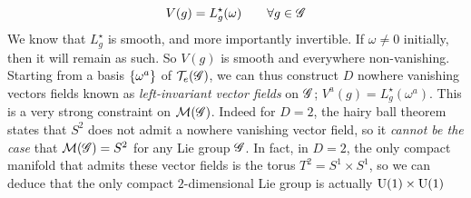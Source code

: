 \begin{equation}
V(g) = L_g^{\star}(\omega) \qquad \forall g \in \mathscr{G}
\end{equation}
We know that $L_g^{\star}$ is smooth, and more importantly invertible. If $\omega \neq 0$ initially, then it will remain as such. So $V(g)$ is smooth and everywhere non-vanishing. Starting from a basis $\set{\omega^a}$ of $\mathcal{T}_e(\mathscr{G})$, we can thus construct $D$ nowhere vanishing vectors fields known as \emph{left-invariant vector fields} on $\mathscr{G}$; $V^a(g) = L_g^\star(\omega^a)$. This is a very strong constraint on $\mathcal{M}(\mathscr{G})$. Indeed for $D = 2$, the hairy ball theorem states that $S^2$ does not admit a nowhere vanishing vector field, so it \emph{cannot be the case} that $\mathcal{M}(\mathscr{G}) = S^2$ for any Lie group $\mathscr{G}$. In fact, in $D = 2$, the only compact manifold that admits these vector fields is the torus $T^2 = S^1 \times S^1$, so we can deduce that the only compact $2$-dimensional Lie group is actually $\Uni{1} \times \Uni{1}$
